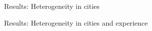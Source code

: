 \documentclass[11pt, aspectratio=169]{beamer}
\begin{document}
\begin{frame}{Results: Heterogeneity in cities}
    \centering
\end{frame}

\begin{frame}{Results: Heterogeneity in cities and experience}
    \centering
\end{frame}
\end{document}

